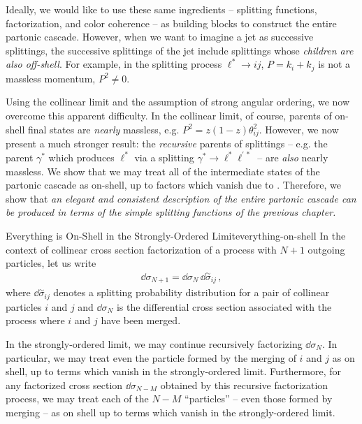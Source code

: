 Ideally, we would like to use these same ingredients -- splitting functions, factorization, and color coherence -- as building blocks to construct the entire partonic cascade.
%
However, when we want to imagine a jet as successive splittings, the successive splittings of the jet include splittings whose \textit{children are also off-shell}.
%
For example, in the splitting process \(\ell^* \to i j\), \(P = k_i + k_j\) is not a massless momentum, \(P^2 \neq 0\).


Using the collinear limit and the assumption of strong angular ordering, we now overcome this apparent difficulty.
%
In the collinear limit, of course, parents of on-shell final states are \textit{nearly} massless, e.g. \(P^2 = z(1-z) \theta^2_{ij}\).
%
However, we now present a much stronger result:
%
the \textit{recursive} parents of splittings -- e.g. the parent \(\gamma^*\) which produces \(\ell^*\) via a splitting \(\gamma^* \to \ell^* \ell^{'\,*}\) -- are \textit{also} nearly massless.
%
We show that we may treat all of the intermediate states of the partonic cascade as on-shell, up to factors which vanish due to .
%
Therefore, we show that \textit{an elegant and consistent description of the entire partonic cascade can be produced in terms of the simple splitting functions of the previous chapter.}


\begin{proposition}{Everything is On-Shell in the Strongly-Ordered Limit}{everything-on-shell}
    In the context of collinear cross section factorization of a process with \(N+1\) outgoing particles, let us write
    \begin{align}
        \dd \sigma_{N+1} = \dd\sigma_N \, \dd\overset{\sim}{\sigma}_{ij}
        \,,
    \end{align}
    where \(\dd\overset{\sim}{\sigma}_{ij}\) denotes a splitting probability distribution for a pair of collinear particles \(i\) and \(j\) and \(\dd\sigma_N\) is the differential cross section associated with the process where \(i\) and \(j\) have been merged.

    In the strongly-ordered limit, we may continue recursively factorizing \(\dd \sigma_N\).
    In particular, we may treat even the particle formed by the merging of \(i\) and \(j\) as on shell, up to terms which vanish in the strongly-ordered limit.
    Furthermore, for any factorized cross section \(\dd\sigma_{N-M}\) obtained by this recursive factorization process, we may treat each of the \(N-M\) ``particles'' -- even those formed by merging -- as on shell up to terms which vanish in the strongly-ordered limit.
\end{proposition}

